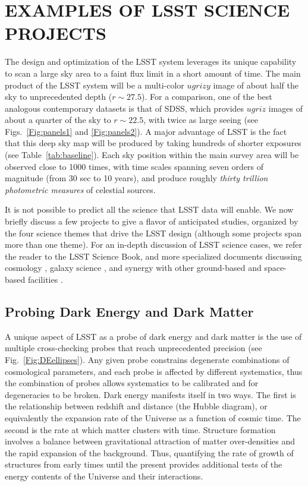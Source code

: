 
\section{EXAMPLES OF LSST SCIENCE PROJECTS}
\label{Sec:science}

The design and optimization of the LSST system leverages its unique capability
to scan a large sky area to a faint flux limit in a short amount of time.
The main product of the LSST system will be a multi-color $ugrizy$ image of about
half the sky to unprecedented depth ($r\sim27.5$). For a comparison,
one of the best
analogous contemporary datasets is that of SDSS, which provides $ugriz$ images
of about a quarter of the sky to $r\sim22.5$, with twice as large seeing
(see Figs.~\ref{Fig:panels1} and \ref{Fig:panels2}). A major advantage of LSST
is the fact that this deep sky map will be produced by taking hundreds of
shorter exposures (see Table~\ref{tab:baseline}). Each sky position within the main survey area
will be observed close to 1000 times, with time scales spanning seven orders of
magnitude (from 30 sec to 10 years), and produce roughly \textit{thirty
trillion photometric measures} of celestial sources.

It is not possible to predict all the science that LSST data will enable.
We now briefly discuss a few projects to give a flavor of anticipated studies,
organized by the four science themes that drive the LSST design
(although some projects span more than one theme).
For an in-depth discussion of LSST science cases, we refer the reader to the
LSST Science Book, and more specialized documents discussing cosmology
\citep{2012arXiv1211.0310L}, galaxy science
\citep{2017arXiv170801617R}, and synergy with other ground-based and
space-based facilities
\citep{2016arXiv161001661N,2015arXiv150107897J,2017ApJS..233...21R}.

\subsection{Probing Dark Energy and Dark Matter }

A unique aspect of LSST as a probe of dark energy and dark matter is
the use of multiple cross-checking probes that reach unprecedented
precision (see Fig.~\ref{Fig:DEellipses}). Any given probe constrains
degenerate combinations of cosmological parameters, and each probe is
affected by different systematics, thus the combination of probes
allows systematics to be calibrated and for degeneracies to be
broken.  Dark energy manifests itself in two ways.  The first is the
relationship between redshift and distance (the Hubble diagram), or
equivalently the expansion rate of the Universe as a function of
cosmic time.  The second is the rate at which matter clusters with
time.
Structure formation involves a balance between
gravitational attraction of matter over-densities and the rapid
expansion of the background.  Thus, quantifying the rate of growth of
structures from early times until the present provides additional
tests of the energy contents of the Universe and their interactions.

